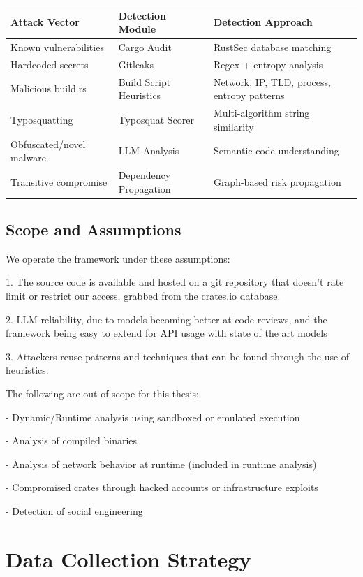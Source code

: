 \begin{tabular}{|p{5cm}|p{3.5cm}|p{6cm}|}
\hline
\textbf{Attack Vector} & \textbf{Detection Module} & \textbf{Detection Approach} \\
\hline
Known vulnerabilities & Cargo Audit & RustSec database matching \\
\hline
Hardcoded secrets & Gitleaks & Regex + entropy analysis \\
\hline
Malicious build.rs & Build Script Heuristics & Network, IP, TLD, process, entropy patterns \\
\hline
Typosquatting & Typosquat Scorer & Multi-algorithm string similarity \\
\hline
Obfuscated/novel malware & LLM Analysis & Semantic code understanding \\
\hline
Transitive compromise & Dependency Propagation & Graph-based risk propagation \\
\hline
\end{tabular}

\subsection{Scope and Assumptions}\label{subsect:scope-assumptions}

We operate the framework under these assumptions:

1. The source code is available and hosted on a git repository that doesn't rate limit or restrict our access, grabbed from the crates.io database.

2. LLM reliability, due to models becoming better at code reviews, and the 
framework being easy to extend for API usage with state of the art models

3. Attackers reuse patterns and techniques that can be found through the use of heuristics.

The following are out of scope for this thesis:

- Dynamic/Runtime analysis using sandboxed or emulated execution

- Analysis of compiled binaries

- Analysis of network behavior at runtime (included in runtime analysis)

- Compromised crates through hacked accounts or infrastructure exploits

- Detection of social engineering

\section{Data Collection Strategy}\label{sect:data-collection}

